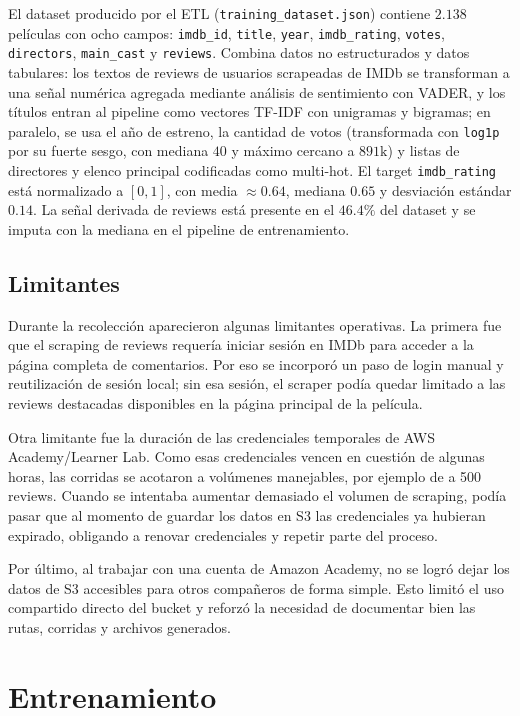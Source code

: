 \documentclass[letterpaper,12pt]{article}
\begin{document}
El dataset producido por el ETL (\texttt{training\_dataset.json}) contiene $2.138$ películas con ocho campos: \texttt{imdb\_id}, \texttt{title}, \texttt{year}, \texttt{imdb\_rating}, \texttt{votes}, \texttt{directors}, \texttt{main\_cast} y \texttt{reviews}. Combina datos no estructurados y datos tabulares: los textos de reviews de usuarios scrapeadas de IMDb se transforman a una señal numérica agregada mediante análisis de sentimiento con VADER, y los títulos entran al pipeline como vectores TF-IDF con unigramas y bigramas; en paralelo, se usa el año de estreno, la cantidad de votos (transformada con \texttt{log1p} por su fuerte sesgo, con mediana $40$ y máximo cercano a $891\text{k}$) y listas de directores y elenco principal codificadas como multi-hot. El target \texttt{imdb\_rating} está normalizado a $[0, 1]$, con media $\approx 0.64$, mediana $0.65$ y desviación estándar $0.14$. La señal derivada de reviews está presente en el $46.4\%$ del dataset y se imputa con la mediana en el pipeline de entrenamiento.

\subsection{Limitantes}

Durante la recolección aparecieron algunas limitantes operativas. La primera fue que el scraping de reviews requería iniciar sesión en IMDb para acceder a la página completa de comentarios. Por eso se incorporó un paso de login manual y reutilización de sesión local; sin esa sesión, el scraper podía quedar limitado a las reviews destacadas disponibles en la página principal de la película.

Otra limitante fue la duración de las credenciales temporales de AWS Academy/Learner Lab. Como esas credenciales vencen en cuestión de algunas horas, las corridas se acotaron a volúmenes manejables, por ejemplo de a 500 reviews. Cuando se intentaba aumentar demasiado el volumen de scraping, podía pasar que al momento de guardar los datos en S3 las credenciales ya hubieran expirado, obligando a renovar credenciales y repetir parte del proceso.

Por último, al trabajar con una cuenta de Amazon Academy, no se logró dejar los datos de S3 accesibles para otros compañeros de forma simple. Esto limitó el uso compartido directo del bucket y reforzó la necesidad de documentar bien las rutas, corridas y archivos generados.

\newpage
\section{Entrenamiento}
\label{sec:entrenamiento}
\end{document}
